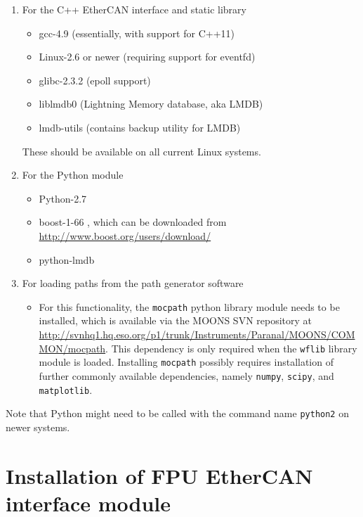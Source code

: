 \documentclass[fontsize=12,a4paper]{scrreprt}
\begin{document}
\begin{enumerate}
  \item For the C++ EtherCAN interface and static library


\begin{itemize}
\item gcc-4.9 (essentially, with support for C++11)
\item Linux-2.6 or newer (requiring support for eventfd)
\item glibc-2.3.2 (epoll support)
\item liblmdb0 (Lightning Memory database, aka LMDB)
\item lmdb-utils (contains backup utility for LMDB)
\end{itemize}

These should be available on all current Linux systems.

\item For the Python module

\begin{itemize}
\item Python-2.7
\item boost-1-66 , which can be downloaded from \url{http://www.boost.org/users/download/}
\item python-lmdb
\end{itemize}


\item For loading paths from the path generator software
\begin{itemize}
\item For this functionality, the \texttt{mocpath} python library
  module needs to be installed, which is available via the MOONS SVN
  repository at
  \url{http://svnhq1.hq.eso.org/p1/trunk/Instruments/Paranal/MOONS/COMMON/mocpath}.
  This dependency is only required when the \texttt{wflib} library
  module is loaded. Installing \texttt{mocpath} possibly requires
  installation of further commonly available dependencies, namely
  \texttt{numpy}, \texttt{scipy}, and \texttt{matplotlib}.
\end{itemize}
\end{enumerate}

Note that Python might need to be called with the command name
\texttt{python2} on newer systems.


\section{Installation of FPU EtherCAN interface module}
\end{document}
